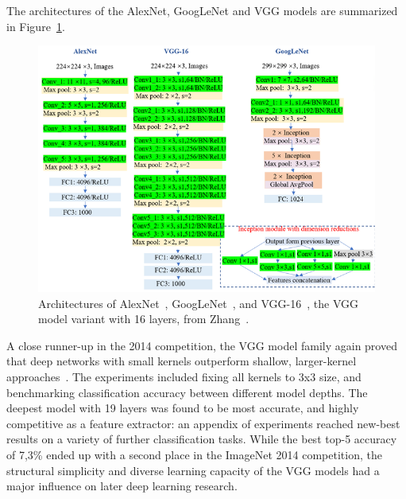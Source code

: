 \documentclass[english,twoside,openright]{UH_DS_MSc}
\begin{document}
The architectures of the AlexNet, GoogLeNet and VGG models are summarized in Figure~\ref{image:famouscnns}.

\begin{figure}[ht]
    \centering
    \includegraphics*[scale=0.6]{images/famouscnns.png}
    \caption{Architectures of AlexNet~\cite{alexnet}, GoogLeNet~\cite{googlelenet}, and VGG-16~\cite{vgg}, the 
    VGG model variant with 16 layers, from Zhang~\cite{zhangImagebasedMethodsDietary2023}.}
    \label{image:famouscnns}
\end{figure}

A close runner-up in the 2014 competition, the VGG model family again proved that deep networks 
with small kernels outperform shallow, larger-kernel approaches~\cite{vgg}. The experiments included fixing all kernels to 3x3 size, and benchmarking classification accuracy between 
different model depths. The deepest model with 19 layers was found to be most accurate, and highly competitive as a feature extractor: an appendix of experiments reached new-best results on a variety of 
further classification tasks. While the 
best top-5 accuracy of 7,3\% ended up with a second place in the ImageNet 2014 competition, the structural simplicity
and diverse learning capacity of the VGG models had a major influence on later deep learning research.
\end{document}
